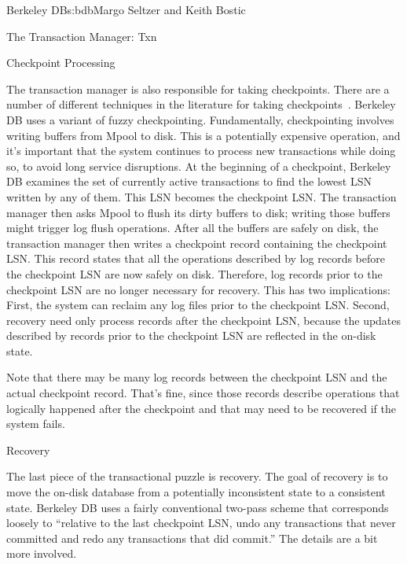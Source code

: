 \begin{aosachapter}{Berkeley DB}{s:bdb}{Margo Seltzer and Keith Bostic}
\begin{aosasect1}{The Transaction Manager: Txn}
\begin{aosasect2}{Checkpoint Processing}


The transaction manager is also responsible for taking checkpoints.
There are a number of different techniques in the literature for
taking checkpoints~\cite{bib:haerder:recovery}. Berkeley DB uses a
variant of fuzzy checkpointing.  Fundamentally, checkpointing involves
writing buffers from Mpool to disk. This is a potentially expensive
operation, and it's important that the system continues to process new
transactions while doing so, to avoid long service disruptions. At the
beginning of a checkpoint, Berkeley DB examines the set of currently
active transactions to find the lowest LSN written by any of
them. This LSN becomes the checkpoint LSN\@. The transaction manager
then asks Mpool to flush its dirty buffers to disk; writing those
buffers might trigger log flush operations. After all the buffers are
safely on disk, the transaction manager then writes a checkpoint
record containing the checkpoint LSN\@.  This record states that all the
operations described by log records before the checkpoint LSN are now
safely on disk.  Therefore, log records prior to the checkpoint LSN
are no longer necessary for recovery. This has two implications:
First, the system can reclaim any log files prior to the checkpoint
LSN\@. Second, recovery need only process records after the checkpoint
LSN, because the updates described by records prior to the checkpoint
LSN are reflected in the on-disk state.

Note that there may be many log records between the checkpoint LSN and
the actual checkpoint record.  That's fine, since those records describe
operations that logically happened after the checkpoint and that may
need to be recovered if the system fails.

\end{aosasect2}

\begin{aosasect2}{Recovery}

The last piece of the transactional puzzle is recovery. The goal of
recovery is to move the on-disk database from a potentially
inconsistent state to a consistent state. Berkeley DB uses a fairly
conventional two-pass scheme that corresponds loosely to ``relative to
the last checkpoint LSN, undo any transactions that never committed
and redo any transactions that did commit.'' The details are a bit
more involved.


\end{aosasect2}
\end{aosasect1}
\end{aosachapter}
